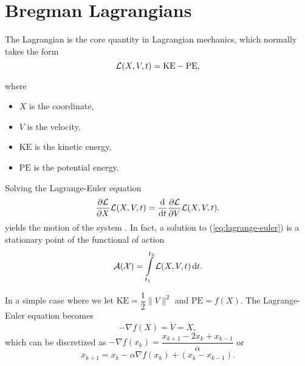 


\section{Bregman Lagrangians}
The Lagrangian is the core quantity in Lagrangian mechanics, which normally takes the form
\begin{equation}
    \mathcal{L}(X, V, t) = \mathrm{KE} - \mathrm{PE},
\end{equation}

where
\begin{itemize}
    \item $X$ is the coordinate,
    \item $V$ is the velocity,
    \item $\mathrm{KE}$ is the kinetic energy,
    \item $\mathrm{PE}$ is the potential energy.
\end{itemize}

Solving the Lagrange-Euler equation
\begin{equation}
    \dfrac{\partial \mathcal{L}}{\partial X} \mathcal{L}(X, V, t) = \dfrac{\mathrm{d}}{\mathrm{d} t} \dfrac{\partial \mathcal{L}}{\partial V} \mathcal{L}(X, V, t).
    \label{eq:lagrange-euler}
\end{equation}
yields the motion of the system \cite{lurie2013analytical}. In fact, a solution to (\ref{eq:lagrange-euler}) is a stationary point of the functional of action
\begin{equation}
    \mathcal{A}(\mathcal{X}) = \int\limits_{t_1}^{t_2}\mathcal{L}(X, V, t)\,\mathrm{d}t.
\end{equation}

In a simple case where we let $\mathrm{KE} = \dfrac{1}{2}\|V\|^2$ and $\mathrm{PE} = f(X)$. The Lagrange-Euler equation becomes
$$-\nabla f(X) = \dot{V} = \ddot{X},$$
which can be discretized as $-\nabla f(x_k) = \dfrac{x_{k+1} - 2x_{k} + x_{k-1}}{\alpha}$ or
\begin{equation}
    x_{k+1} = x_k - \alpha \nabla f(x_k) + (x_k-x_{k-1}).
\end{equation}

